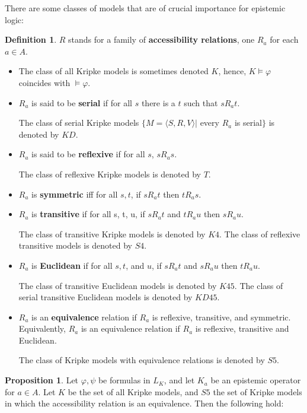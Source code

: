 \documentclass[12pt]{article}
\numberwithin{equation}{section}
\theoremstyle{definition}
\newtheorem{prop}[thm]{Proposition}
\theoremstyle{definition}
\newtheorem{defn}[thm]{Definition}
\theoremstyle{remark}
\begin{document}
There are some classes of models that are of crucial importance for epistemic logic:
\begin{defn}
$R$ stands for a family of \textbf{accessibility relations}, one $R_a$ for each $a\in A$.

\begin{itemize}
\item The class of all Kripke models is sometimes denoted $K$, hence, $K\models\varphi$ coincides with $\models\varphi$.
\item $R_a$ is said to be \textbf{serial} if for all $s$ there is a $t$ such that $sR_a t$.

The class of serial Kripke models $\{M = \langle S, R, V \rangle |$ every $ R_a$ is serial$\}$ is
denoted by $K D$.

\item $R_a$ is said to be \textbf{reflexive} if for all $s$, $sR_a s$.

The class of reflexive Kripke models is denoted by $T$.

\item $R_a$ is \textbf{symmetric} iff for all $s, t$, if $sR_a t$ then $tR_a s$.

\item  $R_a$ is \textbf{transitive} if for all s, t, u, if $sR_a t$ and $tR_a u$ then $sR_a u$.

The class of transitive Kripke models is denoted by $K4$.
The class of reflexive transitive models is denoted by $S4$.
\item $R_a$ is \textbf{Euclidean} if for all $s, t$, and $u$, if $sR_a t$ and $sR_a u$ then $tR_a u$.

The class of transitive Euclidean models is denoted by $K45$.
The class of serial transitive Euclidean models is denoted by $KD45$.
\item $R_a$ is an \textbf{equivalence} relation if $R_a$ is reflexive, transitive, and symmetric. Equivalently, $R_a$ is an equivalence relation if $R_a$ is reflexive, transitive and Euclidean.

The class of Kripke models with equivalence relations is denoted by $S5$.
\end{itemize}

\begin{prop}

Let $\varphi , \psi$ be formulas in $L_K$, and let $K_a$ be an epistemic operator for $a \in A$. Let $K$ be the set of all Kripke models, and $S5$ the set
of Kripke models in which the accessibility relation is an equivalence. Then the following hold:




\end{prop}
\end{defn}
\end{document}
